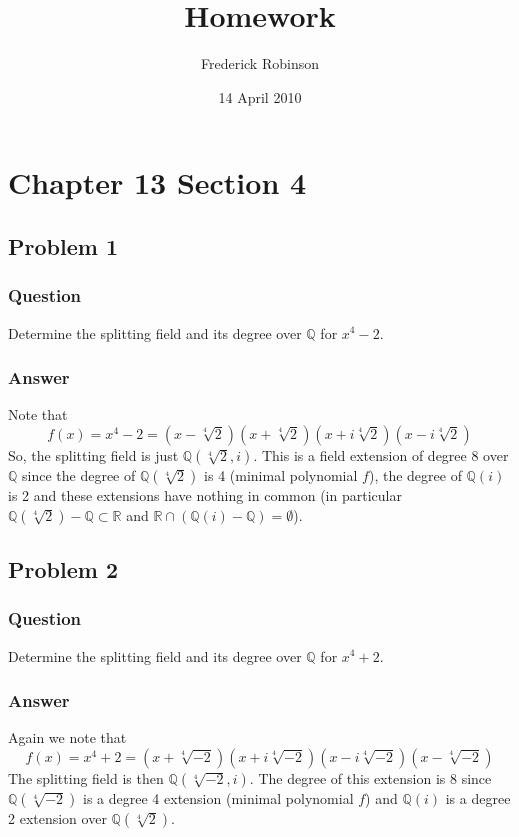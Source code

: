\documentclass[10pt]{article}
\title{Homework}
\author{Frederick Robinson}
\date{14 April 2010}
\begin{document}

   \maketitle

\setcounter{tocdepth}{2} 

\tableofcontents

\section{Chapter 13 Section 4}
\subsection{Problem 1}
\subsubsection{Question}
Determine the splitting field and its degree over $\mathbb{Q}$ for $x^4-2$.
\subsubsection{Answer}
Note that
\[f(x)=x^4-2=(x-\sqrt[4]2)(x+\sqrt[4]2)(x+i\sqrt[4]{2})(x-i\sqrt[4]{2})\]
So, the splitting field is just $\mathbb{Q}(\sqrt[4]2,i)$. This is a field extension of degree 8 over $\mathbb{Q}$ since the degree of $\mathbb{Q}(\sqrt[4]2)$ is 4 (minimal polynomial $f$), the degree of $\mathbb{Q}(i)$ is 2 and these extensions have nothing in common (in particular $\mathbb{Q}(\sqrt[4]2) - \mathbb{Q} \subset \mathbb{R}$ and $\mathbb{R} \cap (\mathbb{Q}(i)- \mathbb{Q}) = \emptyset$).

\subsection{Problem 2}
\subsubsection{Question}
Determine the splitting field and its degree over $\mathbb{Q}$ for $x^4+2$.
\subsubsection{Answer}
Again we note that
\[f(x)=x^4+2=(x+\sqrt[4]{-2})(x+i \sqrt[4]{-2})(x-i \sqrt[4]{-2})(x-\sqrt[4]{-2})\]
The splitting field is then $\mathbb{Q}(\sqrt[4]{-2},i)$. The degree of this extension is 8 since $\mathbb{Q}(\sqrt[4]{-2})$ is a degree 4 extension (minimal polynomial $f$) and $\mathbb{Q}(i)$ is a degree 2 extension over $\mathbb{Q}(\sqrt[4]2)$.
\end{document}
